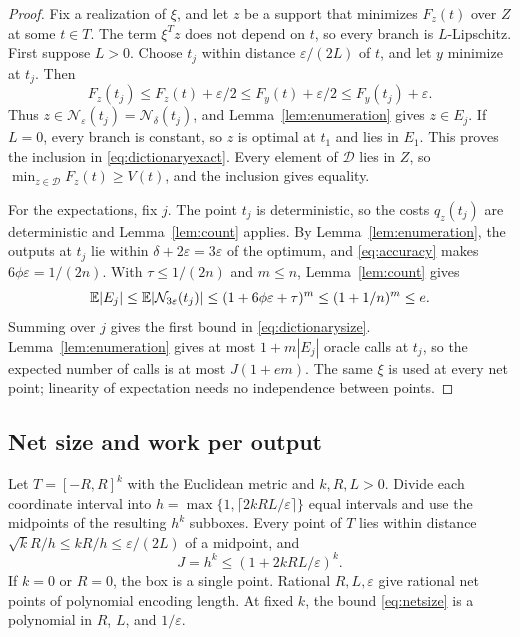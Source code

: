\begin{proof}
Fix a realization of $\xi$, and let $z$ be a support that minimizes
$F_z(t)$ over $Z$ at some $t\in T$. The term $\xi^Tz$ does not depend on
$t$, so every branch is $L$-Lipschitz. First suppose $L>0$. Choose $t_j$
within distance $\varepsilon/(2L)$ of $t$, and let $y$ minimize at $t_j$.
Then
\[
 F_z(t_j)\le F_z(t)+\varepsilon/2
           \le F_y(t)+\varepsilon/2
           \le F_y(t_j)+\varepsilon.
\]
Thus $z\in\mathcal N_\varepsilon(t_j)=\mathcal N_\delta(t_j)$, and
Lemma~\ref{lem:enumeration} gives $z\in E_j$. If $L=0$, every branch is
constant, so $z$ is optimal at $t_1$ and lies in $E_1$. This proves the
inclusion in \eqref{eq:dictionaryexact}. Every element of $\mathcal D$
lies in $Z$, so $\min_{z\in\mathcal D}F_z(t)\ge V(t)$, and the inclusion
gives equality.

For the expectations, fix $j$. The point $t_j$ is deterministic, so the
costs $q_z(t_j)$ are deterministic and Lemma~\ref{lem:count} applies.
By Lemma~\ref{lem:enumeration}, the outputs at $t_j$ lie within
$\delta+2\varepsilon=3\varepsilon$ of the optimum, and
\eqref{eq:accuracy} makes $6\phi\varepsilon=1/(2n)$. With
$\tau\le1/(2n)$ and $m\le n$, Lemma~\ref{lem:count} gives
\[
 \mathbb E|E_j|\le\mathbb E|\mathcal N_{3\varepsilon}(t_j)|
 \le(1+6\phi\varepsilon+\tau)^m
 \le(1+1/n)^m\le e.
\]
Summing over $j$ gives the first bound in \eqref{eq:dictionarysize}.
Lemma~\ref{lem:enumeration} gives at most $1+m|E_j|$ oracle calls at
$t_j$, so the expected number of calls is at most $J(1+em)$. The same
$\xi$ is used at every net point; linearity of expectation needs no
independence between points.
\end{proof}

\subsection{Net size and work per output}\label{sec:net-work}
Let $T=[-R,R]^k$ with the Euclidean metric and $k,R,L>0$. Divide each
coordinate interval into $h=\max\{1,\lceil2kRL/\varepsilon\rceil\}$
equal intervals and use the midpoints of the resulting $h^k$ subboxes.
Every point of $T$ lies within distance $\sqrt{k}R/h\le kR/h\le
\varepsilon/(2L)$ of a midpoint, and
\begin{equation}\label{eq:netsize}
 J=h^k\le(1+2kRL/\varepsilon)^k.
\end{equation}
If $k=0$ or $R=0$, the box is a single point. Rational $R,L,\varepsilon$
give rational net points of polynomial encoding length. At fixed $k$, the
bound \eqref{eq:netsize} is a polynomial in $R$, $L$, and $1/\varepsilon$.

